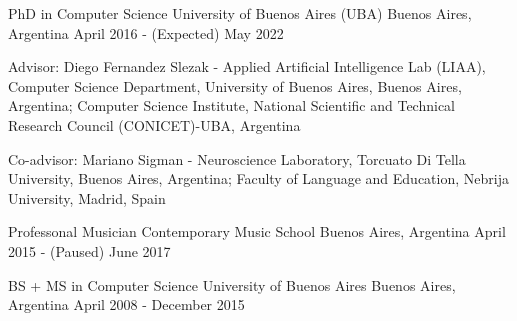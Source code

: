 

\begin{cventries}

  \cventry
    {PhD in Computer Science} %
    {University of Buenos Aires (UBA)} %
    {Buenos Aires, Argentina} %
    {April 2016 - (Expected) May 2022} %
    {
      \begin{cvitems} %
        \item Advisor: Diego Fernandez Slezak - Applied Artificial Intelligence Lab (LIAA),
Computer Science Department, University of Buenos Aires, Buenos Aires, Argentina;
Computer Science Institute, National Scientific and Technical Research Council
(CONICET)-UBA, Argentina
        \item Co-advisor: Mariano Sigman - Neuroscience Laboratory, Torcuato Di
        Tella University, Buenos Aires, Argentina; Faculty of 
        Language and Education, Nebrija University, Madrid, Spain
      \end{cvitems}
    }

  \cventry
    {Professonal Musician} %
    {Contemporary Music School} %
    {Buenos Aires, Argentina} %
    {April 2015 - (Paused) June 2017} %
    {}

  \cventry
    {BS + MS in Computer Science} %
    {University of Buenos Aires} %
    {Buenos Aires, Argentina} %
    {April 2008 - December 2015} %
    {}

\end{cventries}
